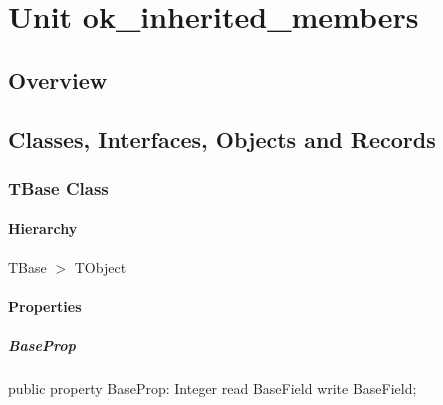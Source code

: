 \documentclass{report}
\begin{document}
\newlength{\tmplength}
\chapter{Unit ok{\_}inherited{\_}members}
\section{Overview}
\begin{description}
\item[\texttt{\begin{ttfamily}TBase\end{ttfamily} Class}]
\item[\texttt{\begin{ttfamily}TDerived\end{ttfamily} Class}]
\item[\texttt{\begin{ttfamily}TNewDerived\end{ttfamily} Class}]
\end{description}
\section{Classes, Interfaces, Objects and Records}
\subsection*{TBase Class}
\subsubsection*{\large{\textbf{Hierarchy}}\normalsize\hspace{1ex}\hfill}
TBase {$>$} TObject
\subsubsection*{\large{\textbf{Properties}}\normalsize\hspace{1ex}\hfill}
\paragraph*{BaseProp}\hspace*{\fill}

\begin{list}{}{
\setlength{\itemindent}{0cm}
\setlength{\listparindent}{0cm}
\setlength{\leftmargin}{\evensidemargin}
\addtolength{\leftmargin}{\tmplength}
\settowidth{\labelsep}{X}
\addtolength{\leftmargin}{\labelsep}
\setlength{\labelwidth}{\tmplength}
}
\begin{flushleft}
\item[\textbf{Declaration}\hfill]
\begin{ttfamily}
public property BaseProp: Integer read BaseField write BaseField;\end{ttfamily}


\end{flushleft}
\end{list}
\end{document}

